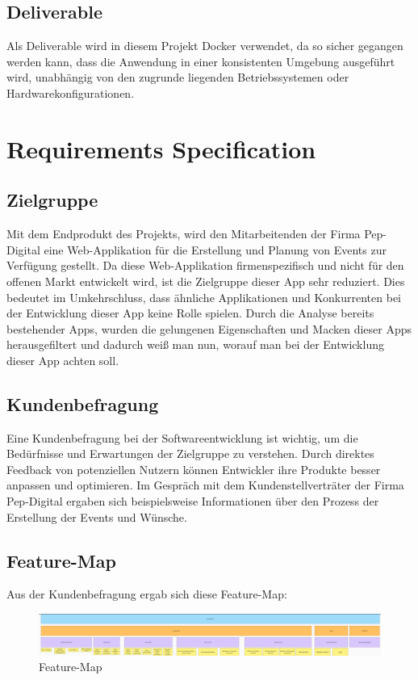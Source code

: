 \documentclass[a4paper,12pt]{article}
\begin{document}
\subsection{Deliverable}
Als Deliverable wird in diesem Projekt Docker verwendet, da so sicher gegangen werden kann, dass die Anwendung in einer konsistenten Umgebung ausgeführt wird, unabhängig von den zugrunde liegenden Betriebssystemen oder Hardwarekonfigurationen.
\newpage
\section{Requirements Specification}
\subsection{Zielgruppe}
Mit dem Endprodukt des Projekts, wird den Mitarbeitenden der Firma Pep-Digital eine Web-Applikation für die Erstellung und Planung von Events zur Verfügung gestellt. Da diese Web-Applikation firmenspezifisch und  nicht für den offenen Markt entwickelt wird, ist die Zielgruppe dieser App sehr reduziert. Dies bedeutet im Umkehrschluss, dass ähnliche Applikationen und Konkurrenten bei der Entwicklung dieser App keine Rolle spielen. Durch die Analyse bereits bestehender Apps, wurden die gelungenen Eigenschaften und Macken dieser Apps herausgefiltert und dadurch weiß man nun, worauf man bei der Entwicklung dieser App achten soll.
\subsection{Kundenbefragung}
Eine Kundenbefragung bei der Softwareentwicklung ist wichtig, um die Bedürfnisse und Erwartungen der Zielgruppe zu verstehen. Durch direktes Feedback von potenziellen Nutzern können Entwickler ihre Produkte besser anpassen und optimieren. Im Gespräch mit dem Kundenstellverträter der Firma Pep-Digital ergaben sich beispielsweise Informationen über den Prozess der Erstellung der Events und Wünsche.
\subsection{Feature-Map}
Aus der Kundenbefragung ergab sich diese Feature-Map:
\begin{figure}[H]
    \centering
    \includegraphics[width=1\textwidth]{Abbildungen/feature_map.png}
    \caption{Feature-Map}
    \label{fig:feature_map}
\end{figure}
\newpage
\end{document}
